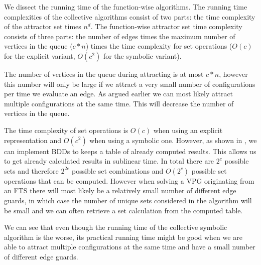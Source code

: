 We dissect the running time of the function-wise algorithms. The running time complexities of the collective algorithms consist of two parts: the time complexity of the attractor set times $n^d$. The function-wise attractor set time complexity consists of three parts: the number of edges times the maximum number of vertices in the queue ($c*n$) times the time complexity for set operations ($O(c)$ for the explicit variant, $O(c^2)$ for the symbolic variant).

The number of vertices in the queue during attracting is at most $c*n$, however this number will only be large if we attract a very small number of configurations per time we evaluate an edge. As argued earlier we can most likely attract multiple configurations at the same time. This will decrease the number of vertices in the queue.

The time complexity of set operations is $O(c)$ when using an explicit representation and $O(c^2)$ when using a symbolic one. However, as shown in \cite{BDD_running_time}, we can implement BDDs to keeps a table of already computed results. This allows us to get already calculated results in sublinear time. In total there are $2^c$ possible sets and therefore $2^{2c}$ possible set combinations and $O(2^c)$ possible set operations that can be computed. However when solving a VPG originating from an FTS there will most likely be a relatively small number of different edge guards, in which case the number of unique sets considered in the algorithm will be small and we can often retrieve a set calculation from the computed table.

We can see that even though the running time of the collective symbolic algorithm is the worse, its practical running time might be good when we are able to attract multiple configurations at the same time and have a small number of different edge guards.